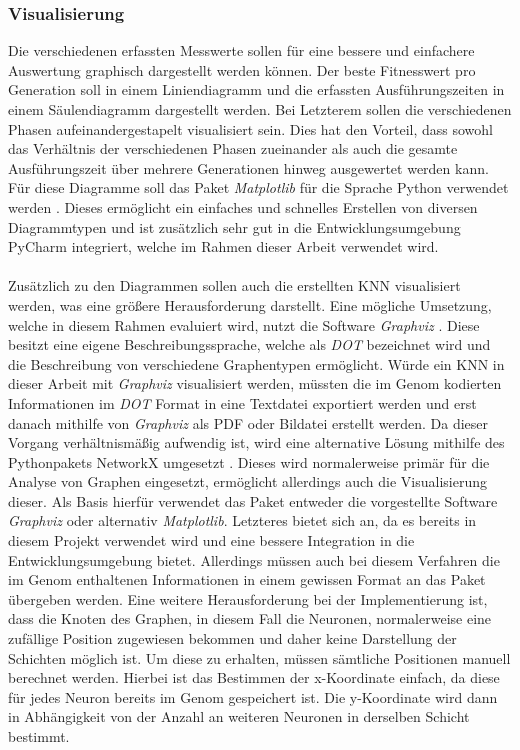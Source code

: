 \subsubsection{Visualisierung}
Die verschiedenen erfassten Messwerte sollen für eine bessere und einfachere Auswertung graphisch dargestellt werden können. Der beste Fitnesswert pro Generation soll in einem Liniendiagramm und die erfassten Ausführungszeiten in einem Säulendiagramm dargestellt werden. Bei Letzterem sollen die verschiedenen Phasen aufeinandergestapelt visualisiert sein. Dies hat den Vorteil, dass sowohl das Verhältnis der verschiedenen Phasen zueinander als auch die gesamte Ausführungszeit über mehrere Generationen hinweg ausgewertet werden kann. Für diese Diagramme soll das Paket \emph{Matplotlib} für die Sprache Python verwendet werden \cite{pyplot2007hunter}. Dieses ermöglicht ein einfaches und schnelles Erstellen von diversen Diagrammtypen und ist zusätzlich sehr gut in die Entwicklungsumgebung PyCharm integriert, welche im Rahmen dieser Arbeit verwendet wird.
\\\\
Zusätzlich zu den Diagrammen sollen auch die erstellten \ac{KNN} visualisiert werden, was eine größere Herausforderung darstellt. Eine mögliche Umsetzung, welche in diesem Rahmen evaluiert wird, nutzt die Software \emph{Graphviz} \cite{graphviz2000gansner}. Diese besitzt eine eigene Beschreibungssprache, welche als \emph{DOT} bezeichnet wird und die Beschreibung von verschiedene Graphentypen ermöglicht. Würde ein \ac{KNN} in dieser Arbeit mit \emph{Graphviz} visualisiert werden, müssten die im  Genom kodierten Informationen im \emph{DOT} Format in eine Textdatei exportiert werden und erst danach mithilfe von \emph{Graphviz} als PDF oder Bildatei erstellt werden. Da dieser Vorgang verhältnismäßig aufwendig ist, wird eine alternative Lösung mithilfe des Pythonpakets NetworkX umgesetzt \cite{networkx2008hagberg}. Dieses wird normalerweise primär für die Analyse von Graphen eingesetzt, ermöglicht allerdings auch die Visualisierung dieser. Als Basis hierfür verwendet das Paket entweder die vorgestellte Software \emph{Graphviz} oder alternativ \emph{Matplotlib}. 
Letzteres bietet sich   an, da es bereits in diesem Projekt verwendet wird und eine bessere Integration in die Entwicklungsumgebung bietet. Allerdings müssen auch bei diesem Verfahren die im Genom enthaltenen Informationen in einem gewissen Format an das Paket übergeben werden. Eine weitere Herausforderung bei der Implementierung ist, dass die Knoten des Graphen, in diesem Fall die Neuronen, normalerweise eine zufällige Position zugewiesen bekommen und daher keine Darstellung der Schichten möglich ist. Um diese zu erhalten, müssen sämtliche Positionen manuell berechnet werden. Hierbei ist das Bestimmen der x-Koordinate einfach, da diese für jedes Neuron bereits im Genom gespeichert ist. Die y-Koordinate wird dann in Abhängigkeit von der Anzahl an weiteren Neuronen in derselben Schicht bestimmt.    

